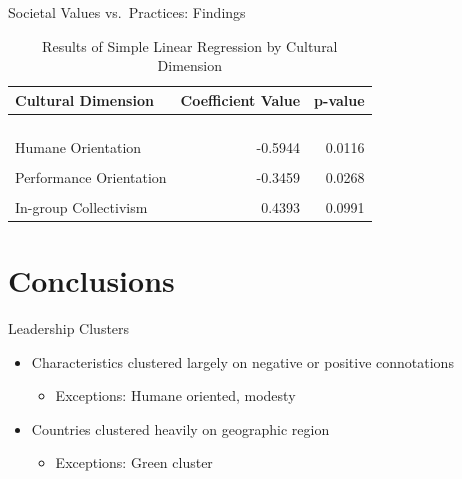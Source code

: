 \documentclass[
  ignorenonframetext,
]{beamer}
\providecommand{\tightlist}{%
  \setlength{\itemsep}{0pt}\setlength{\parskip}{0pt}}
\begin{document}
\begin{frame}{Societal Values vs.~Practices: Findings}
\protect\hypertarget{societal-values-vs.-practices-findings}{}
\begin{table}[!h]

\caption{\label{tab:SPV SLR Table}Results of Simple Linear Regression by Cultural Dimension}
\centering
\begin{tabular}[t]{lrr}
\toprule
Cultural Dimension & Coefficient Value & p-value\\
\midrule
\cellcolor[HTML]{E5F5E0}{Uncertainty Avoidance} & \cellcolor[HTML]{E5F5E0}{-0.6199} & \cellcolor[HTML]{E5F5E0}{0.0000}\\
\cellcolor[HTML]{E5F5E0}{Institutional Collectivism} & \cellcolor[HTML]{E5F5E0}{-0.5251} & \cellcolor[HTML]{E5F5E0}{0.0000}\\
\cellcolor[HTML]{E5F5E0}{Power Distance} & \cellcolor[HTML]{E5F5E0}{-0.4991} & \cellcolor[HTML]{E5F5E0}{0.0006}\\
\cellcolor[HTML]{E5F5E0}{Future Orientation} & \cellcolor[HTML]{E5F5E0}{-0.4725} & \cellcolor[HTML]{E5F5E0}{0.0009}\\
Humane Orientation & -0.5944 & 0.0116\\
\addlinespace
\cellcolor[HTML]{F0F0F0}{Gender Egalitarianism} & \cellcolor[HTML]{F0F0F0}{0.2437} & \cellcolor[HTML]{F0F0F0}{0.0124}\\
Performance Orientation & -0.3459 & 0.0268\\
\cellcolor[HTML]{F0F0F0}{Assertiveness} & \cellcolor[HTML]{F0F0F0}{-0.1507} & \cellcolor[HTML]{F0F0F0}{0.0414}\\
In-group Collectivism & 0.4393 & 0.0991\\
\bottomrule
\end{tabular}
\end{table}
\end{frame}

\hypertarget{conclusions}{%
\section{Conclusions}\label{conclusions}}

\begin{frame}{Leadership Clusters}
\protect\hypertarget{leadership-clusters-1}{}

\begin{itemize}
\tightlist
\item
  Characteristics clustered largely on negative or positive connotations

  \begin{itemize}
  \tightlist
  \item
    Exceptions: Humane oriented, modesty
  \end{itemize}
\item
  Countries clustered heavily on geographic region

  \begin{itemize}
  \tightlist
  \item
    Exceptions: \textcolor{clust6}{Green cluster}
  \end{itemize}
\end{itemize}
\end{frame}
\end{document}
